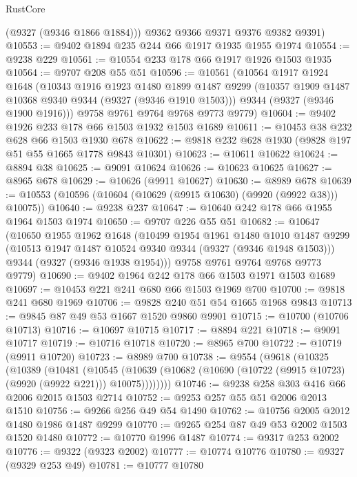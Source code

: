 \begin{lexlean}{RustCore}
\begin{coremodule}
        (@9327 (@9346 @1866 @1884)))
      @9362
      @9366
      @9371
      @9376
      @9382
      @9391)
@10553 := @9402 @1894 @235 @244 @66 @1917 @1935 @1955 @1974
@10554 := @9238 @229
@10561 := @10554 @233 @178 @66 @1917 @1926 @1503 @1935
@10564 := @9707 @208 @55 @51
@10596 := @10561
    (@10564
      @1917
      @1924
      @1648
      (@10343
        @1916
        @1923
        @1480
        @1899
        @1487
        @9299
        (@10357 @1909 @1487 @10368 @9340 @9344 (@9327 (@9346 @1910 @1503)))
        @9344
        (@9327 (@9346 @1900 @1916)))
      @9758
      @9761
      @9764
      @9768
      @9773
      @9779)
@10604 := @9402 @1926 @233 @178 @66 @1503 @1932 @1503 @1689
@10611 := @10453 @38 @232 @628 @66 @1503 @1930 @678
@10622 := @9818 @232 @628 @1930 (@9828 @197 @51 @55 @1665 @1778 @9843 @10301)
@10623 := @10611 @10622
@10624 := @8894 @38
@10625 := @9091 @10624
@10626 := @10623 @10625
@10627 := @8965 @678
@10629 := @10626 (@9911 @10627)
@10630 := @8989 @678
@10639 := @10553 (@10596 (@10604 (@10629 (@9915 @10630) (@9920 (@9922 @38))) @10075))
@10640 := @9238 @237
@10647 := @10640 @242 @178 @66 @1955 @1964 @1503 @1974
@10650 := @9707 @226 @55 @51
@10682 := @10647
    (@10650
      @1955
      @1962
      @1648
      (@10499
        @1954
        @1961
        @1480
        @1010
        @1487
        @9299
        (@10513 @1947 @1487 @10524 @9340 @9344 (@9327 (@9346 @1948 @1503)))
        @9344
        (@9327 (@9346 @1938 @1954)))
      @9758
      @9761
      @9764
      @9768
      @9773
      @9779)
@10690 := @9402 @1964 @242 @178 @66 @1503 @1971 @1503 @1689
@10697 := @10453 @221 @241 @680 @66 @1503 @1969 @700
@10700 := @9818 @241 @680 @1969
@10706 := @9828 @240 @51 @54 @1665 @1968 @9843
@10713 := @9845 @87 @49 @53 @1667 @1520 @9860 @9901
@10715 := @10700 (@10706 @10713)
@10716 := @10697 @10715
@10717 := @8894 @221
@10718 := @9091 @10717
@10719 := @10716 @10718
@10720 := @8965 @700
@10722 := @10719 (@9911 @10720)
@10723 := @8989 @700
@10738 := @9554
    (@9618
      (@10325
        (@10389
          (@10481
            (@10545
              (@10639 (@10682 (@10690 (@10722 (@9915 @10723) (@9920 (@9922 @221))) @10075))))))))
@10746 := @9238 @258 @303 @416 @66 @2006 @2015 @1503 @2714
@10752 := @9253 @257 @55 @51 @2006 @2013 @1510
@10756 := @9266 @256 @49 @54 @1490
@10762 := @10756 @2005 @2012 @1480 @1986 @1487 @9299
@10770 := @9265 @254 @87 @49 @53 @2002 @1503 @1520 @1480
@10772 := @10770 @1996 @1487
@10774 := @9317 @253 @2002
@10776 := @9322 (@9323 @2002)
@10777 := @10774 @10776
@10780 := @9327 (@9329 @253 @49)
@10781 := @10777 @10780

\end{coremodule}
\end{lexlean}
